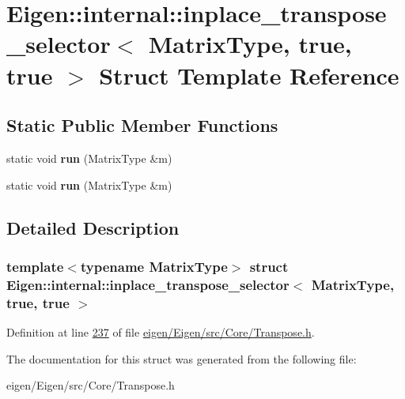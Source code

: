 \hypertarget{struct_eigen_1_1internal_1_1inplace__transpose__selector_3_01_matrix_type_00_01true_00_01true_01_4}{}\section{Eigen\+:\+:internal\+:\+:inplace\+\_\+transpose\+\_\+selector$<$ Matrix\+Type, true, true $>$ Struct Template Reference}
\label{struct_eigen_1_1internal_1_1inplace__transpose__selector_3_01_matrix_type_00_01true_00_01true_01_4}
\subsection*{Static Public Member Functions}
\begin{DoxyCompactItemize}
\item 
\mbox{\label{struct_eigen_1_1internal_1_1inplace__transpose__selector_3_01_matrix_type_00_01true_00_01true_01_4_ade80113166d3d27b8631ba4549269926}} 
static void {\bfseries run} (Matrix\+Type \&m)
\item 
\mbox{\label{struct_eigen_1_1internal_1_1inplace__transpose__selector_3_01_matrix_type_00_01true_00_01true_01_4_ade80113166d3d27b8631ba4549269926}} 
static void {\bfseries run} (Matrix\+Type \&m)
\end{DoxyCompactItemize}


\subsection{Detailed Description}
\subsubsection*{template$<$typename Matrix\+Type$>$\newline
struct Eigen\+::internal\+::inplace\+\_\+transpose\+\_\+selector$<$ Matrix\+Type, true, true $>$}



Definition at line \hyperlink{eigen_2_eigen_2src_2_core_2_transpose_8h_source_l00237}{237} of file \hyperlink{eigen_2_eigen_2src_2_core_2_transpose_8h_source}{eigen/\+Eigen/src/\+Core/\+Transpose.\+h}.



The documentation for this struct was generated from the following file\+:\begin{DoxyCompactItemize}
\item 
eigen/\+Eigen/src/\+Core/\+Transpose.\+h\end{DoxyCompactItemize}
